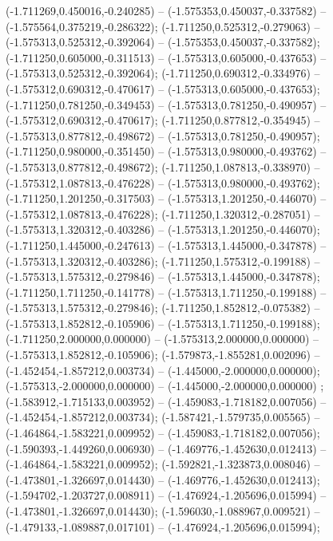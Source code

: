  (-1.711269,0.450016,-0.240285) -- (-1.575353,0.450037,-0.337582) -- (-1.575564,0.375219,-0.286322);
 (-1.711250,0.525312,-0.279063) -- (-1.575313,0.525312,-0.392064) -- (-1.575353,0.450037,-0.337582);
 (-1.711250,0.605000,-0.311513) -- (-1.575313,0.605000,-0.437653) -- (-1.575313,0.525312,-0.392064);
 (-1.711250,0.690312,-0.334976) -- (-1.575312,0.690312,-0.470617) -- (-1.575313,0.605000,-0.437653);
 (-1.711250,0.781250,-0.349453) -- (-1.575313,0.781250,-0.490957) -- (-1.575312,0.690312,-0.470617);
 (-1.711250,0.877812,-0.354945) -- (-1.575313,0.877812,-0.498672) -- (-1.575313,0.781250,-0.490957);
 (-1.711250,0.980000,-0.351450) -- (-1.575313,0.980000,-0.493762) -- (-1.575313,0.877812,-0.498672);
 (-1.711250,1.087813,-0.338970) -- (-1.575312,1.087813,-0.476228) -- (-1.575313,0.980000,-0.493762);
 (-1.711250,1.201250,-0.317503) -- (-1.575313,1.201250,-0.446070) -- (-1.575312,1.087813,-0.476228);
 (-1.711250,1.320312,-0.287051) -- (-1.575313,1.320312,-0.403286) -- (-1.575313,1.201250,-0.446070);
 (-1.711250,1.445000,-0.247613) -- (-1.575313,1.445000,-0.347878) -- (-1.575313,1.320312,-0.403286);
 (-1.711250,1.575312,-0.199188) -- (-1.575313,1.575312,-0.279846) -- (-1.575313,1.445000,-0.347878);
 (-1.711250,1.711250,-0.141778) -- (-1.575313,1.711250,-0.199188) -- (-1.575313,1.575312,-0.279846);
 (-1.711250,1.852812,-0.075382) -- (-1.575313,1.852812,-0.105906) -- (-1.575313,1.711250,-0.199188);
 (-1.711250,2.000000,0.000000) -- (-1.575313,2.000000,0.000000) -- (-1.575313,1.852812,-0.105906);
 (-1.579873,-1.855281,0.002096) -- (-1.452454,-1.857212,0.003734) -- (-1.445000,-2.000000,0.000000);
 (-1.575313,-2.000000,0.000000) -- (-1.445000,-2.000000,0.000000) ;
 (-1.583912,-1.715133,0.003952) -- (-1.459083,-1.718182,0.007056) -- (-1.452454,-1.857212,0.003734);
 (-1.587421,-1.579735,0.005565) -- (-1.464864,-1.583221,0.009952) -- (-1.459083,-1.718182,0.007056);
 (-1.590393,-1.449260,0.006930) -- (-1.469776,-1.452630,0.012413) -- (-1.464864,-1.583221,0.009952);
 (-1.592821,-1.323873,0.008046) -- (-1.473801,-1.326697,0.014430) -- (-1.469776,-1.452630,0.012413);
 (-1.594702,-1.203727,0.008911) -- (-1.476924,-1.205696,0.015994) -- (-1.473801,-1.326697,0.014430);
 (-1.596030,-1.088967,0.009521) -- (-1.479133,-1.089887,0.017101) -- (-1.476924,-1.205696,0.015994);
